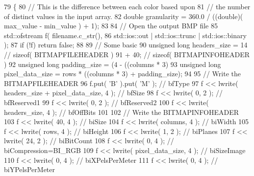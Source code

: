 \begin{DoxyCode}
79       \{
80     \textcolor{comment}{// This is the difference between each color based upon}
81     \textcolor{comment}{// the number of distinct values in the input array.}
82     \textcolor{keywordtype}{double} granularity = 360.0 / ((double)( max\_value - min\_value ) + 1);
83 
84     \textcolor{comment}{// Open the output BMP file}
85     std::ofstream f( filename.c\_str(),
86                      std::ios::out | std::ios::trunc | std::ios::binary );
87     \textcolor{keywordflow}{if} (!f) \textcolor{keywordflow}{return} \textcolor{keyword}{false};
88 
89     \textcolor{comment}{// Some basic}
90     \textcolor{keywordtype}{unsigned} \textcolor{keywordtype}{long} headers\_size    = 14  \textcolor{comment}{// sizeof( BITMAPFILEHEADER )}
91                                   + 40; \textcolor{comment}{// sizeof( BITMAPINFOHEADER )}
92     \textcolor{keywordtype}{unsigned} \textcolor{keywordtype}{long} padding\_size    = (4 - ((columns * 3) %
93     \textcolor{keywordtype}{unsigned} \textcolor{keywordtype}{long} pixel\_data\_size = rows * ((columns * 3) + padding\_size);
94 
95     \textcolor{comment}{// Write the BITMAPFILEHEADER}
96     f.put( \textcolor{charliteral}{'B'} ).put( \textcolor{charliteral}{'M'} );                           \textcolor{comment}{// bfType}
97     f << lwrite( headers\_size + pixel\_data\_size, 4 );  \textcolor{comment}{// bfSize}
98     f << lwrite( 0,                              2 );  \textcolor{comment}{// bfReserved1}
99     f << lwrite( 0,                              2 );  \textcolor{comment}{// bfReserved2}
100     f << lwrite( headers\_size,                   4 );  \textcolor{comment}{// bfOffBits}
101 
102     \textcolor{comment}{// Write the BITMAPINFOHEADER}
103     f << lwrite( 40,                             4 );  \textcolor{comment}{// biSize}
104     f << lwrite( columns,                        4 );  \textcolor{comment}{// biWidth}
105     f << lwrite( rows,                           4 );  \textcolor{comment}{// biHeight}
106     f << lwrite( 1,                              2 );  \textcolor{comment}{// biPlanes}
107     f << lwrite( 24,                             2 );  \textcolor{comment}{// biBitCount}
108     f << lwrite( 0,                              4 );  \textcolor{comment}{// biCompression=BI\_RGB}
109     f << lwrite( pixel\_data\_size,                4 );  \textcolor{comment}{// biSizeImage}
110     f << lwrite( 0,                              4 );  \textcolor{comment}{// biXPelsPerMeter}
111     f << lwrite( 0,                              4 );  \textcolor{comment}{// biYPelsPerMeter}

\end{DoxyCode}
